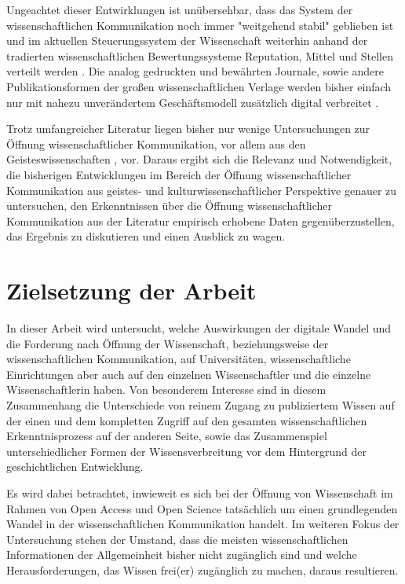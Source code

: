 Ungeachtet dieser Entwirklungen ist unübersehbar, dass das System der wissenschaftlichen Kommunikation noch immer "weitgehend stabil" \cite{Hanekop_2014} geblieben ist und im aktuellen Steuerungssystem der Wissenschaft weiterhin anhand der tradierten wissenschaftlichen Bewertungssysteme Reputation, Mittel und Stellen verteilt werden \cite{cite:4}. Die analog gedruckten und bewährten Journale, sowie andere Publikationsformen der großen wissenschaftlichen Verlage werden bisher einfach nur mit nahezu unverändertem Geschäftsmodell zusätzlich digital verbreitet \cite{Hanekop_2014} \cite{boai_2012}.

Trotz umfangreicher Literatur liegen bisher nur wenige Untersuchungen zur Öffnung wissenschaftlicher Kommunikation, vor allem aus den Geisteswissenschaften \cite{naeder_2010_open}, vor. Daraus ergibt sich die Relevanz und Notwendigkeit, die bisherigen Entwicklungen im Bereich der Öffnung wissenschaftlicher Kommunikation aus geistes- und kulturwissenschaftlicher Perspektive genauer zu untersuchen, den Erkenntnissen über die Öffnung wissenschaftlicher Kommunikation aus der Literatur empirisch erhobene Daten gegenüberzustellen, das Ergebnis zu diskutieren und einen Ausblick zu wagen.

\section{Zielsetzung der Arbeit}

In dieser Arbeit wird untersucht, welche Auswirkungen der digitale Wandel und die Forderung nach Öffnung der Wissenschaft, beziehungsweise der wissenschaftlichen Kommunikation, auf Universitäten, wissenschaftliche Einrichtungen aber auch auf den einzelnen Wissenschaftler und die einzelne Wissenschaftlerin haben. Von besonderem Interesse sind in diesem Zusammenhang die Unterschiede von reinem Zugang zu publiziertem Wissen auf der einen und dem kompletten Zugriff auf den gesamten wissenschaftlichen Erkenntnisprozess auf der anderen Seite, sowie das Zusammenspiel unterschiedlicher Formen der Wissensverbreitung vor dem Hintergrund der geschichtlichen Entwicklung.

Es wird dabei betrachtet, inwieweit es sich bei der Öffnung von Wissenschaft im Rahmen von Open Access und Open Science tatsächlich um einen grundlegenden Wandel in der wissenschaftlichen Kommunikation handelt. Im weiteren Fokus der Untersuchung stehen der Umstand, dass die meisten wissenschaftlichen Informationen der Allgemeinheit bisher nicht zugänglich sind und welche Herausforderungen, das Wissen frei(er) zugänglich zu machen, daraus resultieren.

